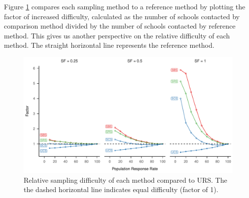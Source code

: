 \documentclass[
  english,
  man,floatsintext]{apa6}
\begin{document}
Figure \ref{fig:fig-rel-per} compares each sampling method to a reference method by plotting the factor of increased difficulty, calculated as the number of schools contacted by comparison method divided by the number of schools contacted by reference method. This gives us another perspective on the relative difficulty of each method. The straight horizontal line represents the reference method.



\begin{figure}
\centering
\includegraphics{6---Paper_files/figure-latex/fig-rel-per-1.pdf}
\caption{\label{fig:fig-rel-per}Relative sampling difficulty of each method compared to URS. The the dashed horizontal line indicates equal difficulty (factor of 1).}
\end{figure}

\newpage
\end{document}
